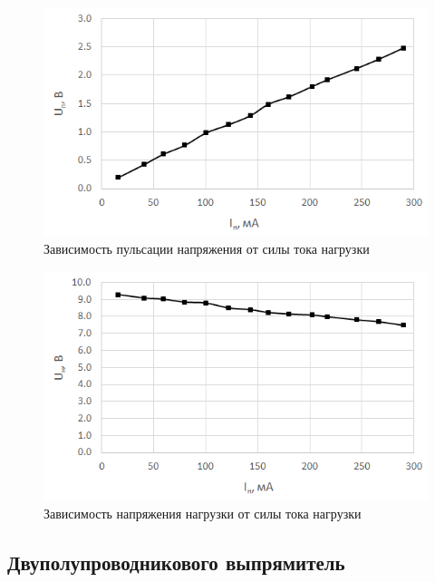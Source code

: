 \begin{figure}[H]
	\begin{center}
		\includegraphics[width=14cm]{img/2}
		\caption{Зависимость пульсации напряжения от силы тока нагрузки}
		\label{g:2} %
	\end{center}
\end{figure}

\begin{figure}[H]
	\begin{center}
		\includegraphics[width=14cm]{img/3}
		\caption{Зависимость напряжения нагрузки от силы тока нагрузки}
		\label{g:3} %
	\end{center}
\end{figure}

\subsection{Двуполупроводникового выпрямитель}

